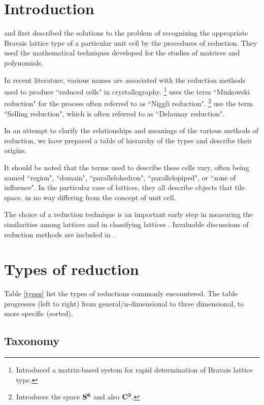 \documentclass[preprint]{iucr}              %
\numberwithin{equation}{section}
\begin{document}
	
	\section{Introduction}
	
	 and  
	first described the solutions
	to the problem of recognizing the appropriate Bravais 
	lattice type of a particular unit cell by the procedures 
	of reduction. They used the mathematical techniques 
	developed for the studies of matrices and polynomials.
	
	In recent literature, various names are associated with 
	the reduction methods used to produce ``reduced cells"
	in crystallography. \footnote{Introduced a matrix-based system for rapid determination of Bravais
	lattice type.} uses 
	the term ``Minkowski reduction" for the process often referred to as ``Niggli reduction". \footnote{Introduces the space $\bf{S^6}$ and also $\bf{C^3}$.} use the term 
	``Selling reduction", which is often 
	referred to as ``Delaunay reduction".
	
	In an attempt to clarify the relationships and meanings of the various 
	methods of reduction, we have prepared a table of hierarchy of the types
	and describe their origins.
	
	It should be noted that the terms used to describe these cells vary,
	often being named ``region", ``domain", ``parallelohedron", ``parallelopiped", or ``zone of influence". In the particular 
	case of lattices, they all describe objects that tile space, in no way
	differing from the concept of unit cell.

    The choice of a reduction technique is an important early step in measuring the similarities among lattices and in
    classifying lattices \cite{andrews2023measuring} 
    \cite{andrews2023approximating}. Invaluable discussions of 
    reduction methods are included in .
	
	\section{Types of reduction}
	
	Table \ref{types} list the types of reductions commonly encountered. The table
	progresses (left to right) from general/n-dimensional to three dimensional, to
	more specific (sorted).
	
	\subsection{Taxonomy}
	
\end{document}
